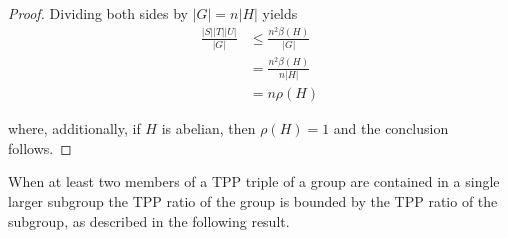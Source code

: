 \documentclass{amsart}
\theoremstyle{observation}
\theoremstyle{definition}
\theoremstyle{remark}
\numberwithin{equation}{section}
\begin{document}
\begin{proof}
Dividing both sides by $|G| = n|H|$ yields
\begin{align*}\frac{|S||T||U|}{|G|} &\leq \frac{n^2\beta(H)}{|G|} \\
                                    &= \frac{n^2\beta(H)}{n|H|} \\
                                    &= n\rho(H)
\end{align*}


where, additionally, if $H$ is abelian, then $\rho(H) = 1$ and the conclusion follows.
\end{proof}

When at least two members of a TPP triple of a group are contained in a single larger subgroup the TPP ratio of the group is bounded by the TPP ratio of the subgroup, as described in the following result.
\end{document}
